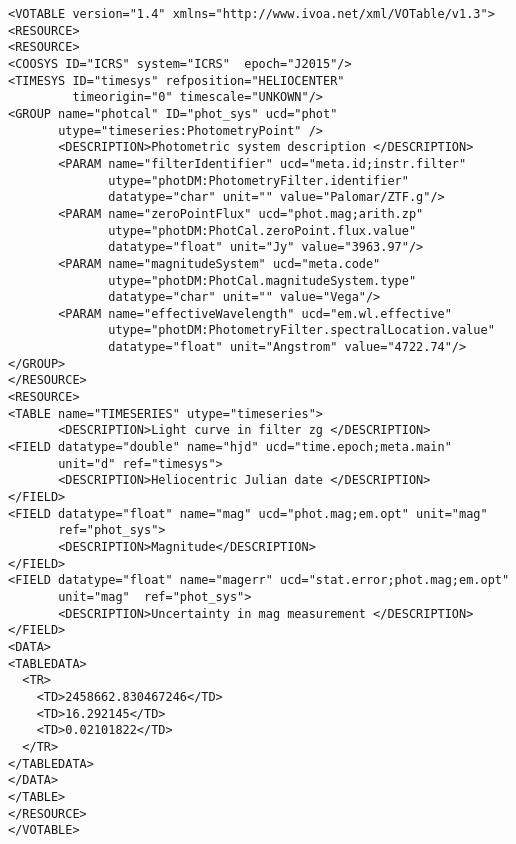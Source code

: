\noindent
\begingroup\footnotesize
\begin{tcolorbox}
\begin{verbatim}
<VOTABLE version="1.4" xmlns="http://www.ivoa.net/xml/VOTable/v1.3">
<RESOURCE>
<RESOURCE>
<COOSYS ID="ICRS" system="ICRS"  epoch="J2015"/>
<TIMESYS ID="timesys" refposition="HELIOCENTER" 
         timeorigin="0" timescale="UNKOWN"/>
<GROUP name="photcal" ID="phot_sys" ucd="phot" 
       utype="timeseries:PhotometryPoint" /> 
       <DESCRIPTION>Photometric system description </DESCRIPTION>
       <PARAM name="filterIdentifier" ucd="meta.id;instr.filter" 
              utype="photDM:PhotometryFilter.identifier" 
              datatype="char" unit="" value="Palomar/ZTF.g"/>
       <PARAM name="zeroPointFlux" ucd="phot.mag;arith.zp" 
              utype="photDM:PhotCal.zeroPoint.flux.value" 
              datatype="float" unit="Jy" value="3963.97"/>
       <PARAM name="magnitudeSystem" ucd="meta.code" 
              utype="photDM:PhotCal.magnitudeSystem.type" 
              datatype="char" unit="" value="Vega"/>
       <PARAM name="effectiveWavelength" ucd="em.wl.effective" 
              utype="photDM:PhotometryFilter.spectralLocation.value" 
              datatype="float" unit="Angstrom" value="4722.74"/>
</GROUP>
</RESOURCE>
<RESOURCE>
<TABLE name="TIMESERIES" utype="timeseries">
       <DESCRIPTION>Light curve in filter zg </DESCRIPTION>
<FIELD datatype="double" name="hjd" ucd="time.epoch;meta.main" 
       unit="d" ref="timesys">
       <DESCRIPTION>Heliocentric Julian date </DESCRIPTION>
</FIELD>
<FIELD datatype="float" name="mag" ucd="phot.mag;em.opt" unit="mag" 
       ref="phot_sys">
       <DESCRIPTION>Magnitude</DESCRIPTION>
</FIELD>
<FIELD datatype="float" name="magerr" ucd="stat.error;phot.mag;em.opt" 
       unit="mag"  ref="phot_sys">
       <DESCRIPTION>Uncertainty in mag measurement </DESCRIPTION>
</FIELD>
<DATA>  
<TABLEDATA>
  <TR>
    <TD>2458662.830467246</TD>
    <TD>16.292145</TD>
    <TD>0.02101822</TD>
  </TR>
</TABLEDATA>
</DATA>
</TABLE>
</RESOURCE>
</VOTABLE>
\end{verbatim}
\end{tcolorbox}
\endgroup
